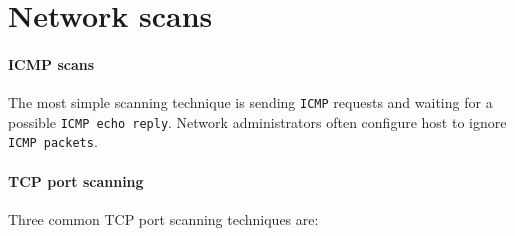 \section{Network scans}
\paragraph{ICMP scans} The most simple scanning technique is sending \texttt{ICMP} requests and waiting for a possible \texttt{ICMP echo reply}. Network administrators often configure host to ignore \texttt{ICMP packets}.

\paragraph{TCP port scanning}

Three common TCP port scanning techniques are:


